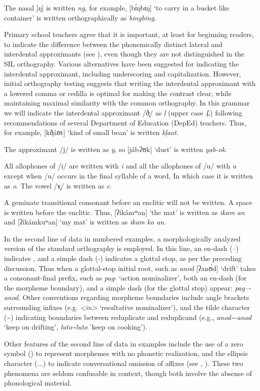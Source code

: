 The nasal [ŋ] is written \textit{ng}, for example, [bɪ́ŋbɪŋ] ‘to carry in a bucket like container’ is written orthographically as \textit{bingbing}.

Primary school teachers agree that it is important, at least for beginning readers, to indicate the difference between the phonemically distinct lateral and interdental approximants (see ), even though they are not distinguished in the SIL orthography. Various alternatives have been suggested for indicating the interdental approximant, including underscoring and capitalization. However, initial orthography testing suggests that writing the interdental approximant with a lowered comma or cedilla is optimal for making the contrast clear, while maintaining maximal similarity with the common orthography. In this grammar we will indicate the interdental approximant /ð̞/ as \textit{ļ} (upper case \textit{\c{L}}) following recommendations of several Department of Education (DepEd) teachers. Thus, for example, [kð̞áʊt] ‘kind of small bean’ is written \textit{kļaot}.

The approximant /j/ is written as \textit{y}, so [jábɁʊk] ‘dust’ is written \textit{yab-ok.}

All allophones of /i/ are written with \textit{i} and all the allophones of /u/ with \textit{u} except when /u/ occurs in the final syllable of a word, In which case it is written as \textit{o}. The vowel /ɤ̞/ is written as \textit{e}.

A geminate transitional consonant before an enclitic will not be written. A space is written before the enclitic. Thus, [ʔikámᵐan] ‘the mat’ is written as \textit{ikam an} and [ʔikámkuʷan] ‘my mat’ is written as \textit{ikam ko an.}

In the second line of data in numbered examples, a morphologically analyzed version of the standard orthography is employed. In this line, an en-dash (--) indicates , and a simple dash (-) indicates a glottal stop, as per the preceding discussion. Thus when a glottal-stop initial root, such as \textit{anod} [ʔanʊ́d] `drift' takes a consonant-final prefix, such as \textit{pag}- `action nominalizer', both an en-dash (for the morpheme boundary), and a simple dash (for the glottal stop) appear: \textit{pag--{}-anod}. Other conventions regarding morpheme boundaries include angle brackets surrounding infixes (e.g. \textit{<in>} `resultative nominalizer'), and the tilde character (\sim{}) indicating boundaries between reduplicate and reduplicand (e.g., \textit{anod\sim{}-anod} `keep on drifting', \textit{luto\sim{}luto} 'keep on cooking'). 

Other features of the second line of data in examples include the use of a zero symbol (\emptyset{}) to represent morphemes with no phonetic realization, and the ellipsis character (...) to indicate conversational omission of affixes (see , ). These two phenomena are seldom confusable in context, though both involve the absense of phonological material. 
